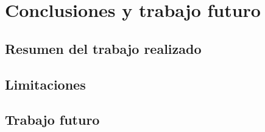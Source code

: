 \chapter{Conclusiones y trabajo futuro}
\label{ch:conclusiones}

\section{Resumen del trabajo realizado}
\label{sec:resumen-trabajo}

\section{Limitaciones}
\label{sec:limitaciones}

\section{Trabajo futuro}
\label{sec:trabajo-futuro}
